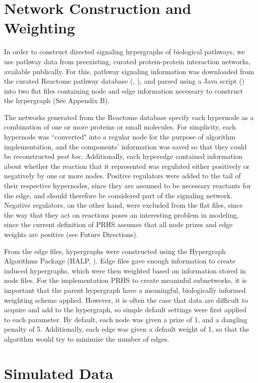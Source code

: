 \documentclass[12pt,twoside]{reedthesis}
\theoremstyle{definition}
\begin{document}
  \section{Network Construction and Weighting}
  In order to construct directed signaling hypergraphs of biological pathways, we use pathway data from preexisting, curated protein-protein interaction networks, available publically. For this, pathway signaling information was downloaded from the curated Reactome pathway database (\cite{Croft2014}, \cite{Milacic2012}), and parsed using a Java script (\cite{AnnaCorrespondence}) into two flat files containing node and edge information necessary to construct the hypergraph (See Appendix B).\par
  The networks generated from the Reactome database specify each hypernode as a combination of one or more proteins or small molecules. For simplicity, each hypernode was ``converted" into a regular node for the purpose of algorithm implementation, and the components' information was saved so that they could be reconstructed \textit{post hoc}. Additionally, each hyperedge contained information about whether the reaction that it represented was regulated either positively or negatively by one or more nodes. Positive regulators were added to the tail of their respective hypernodes, since they are assumed to be necessary reactants for the edge, and should therefore be considered part of the signaling network. Negative regulators, on the other hand, were excluded from the flat files, since the way that they act on reactions poses an interesting problem in modeling, since the current definition of PRHS assumes that all node prizes and edge weights are positive (see Future Directions).\par
  From the edge files, hypergraphs were constructed using the Hypergraph Algorithms Package (HALP, \cite{halp}). Edge files gave enough information to create induced hypergraphs, which were then weighted based on information stored in node files. For the implementation PRHS to create meaninful subnetworks, it is important that the parent hypergraph have a meaningful, biologically informed weighting scheme applied. However, it is often the case that data are difficult to acquire and add to the hypergraph, so simple default settings were first applied to each parameter. By default, each node was given a prize of 1, and a dangling penalty of 5.  Additionally, each edge was given a default weight of 1, so that the algorithm would try to minimize the number of edges.

  \section{Simulated Data}
\end{document}
